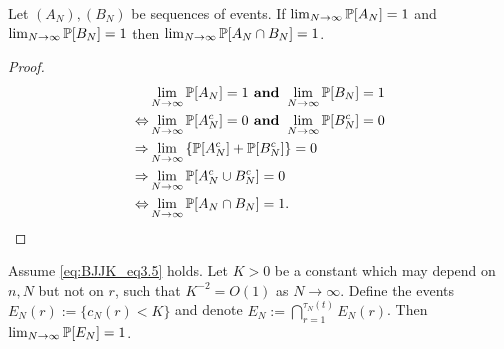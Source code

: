 \begin{lemma}\label{thm:lim_AandB}
Let $(A_N) , (B_N)$ be sequences of events. 
If $\lim_{N\to\infty}\mathbb{P}[A_N] =1$ and $\lim_{N\to\infty}\mathbb{P}[B_N]=1$ then $\lim_{N\to\infty} \mathbb{P} [A_N \cap B_N] =1$.
\end{lemma}
\begin{proof}
\begin{align*}
&\lim_{N\to\infty} \mathbb{P}[A_N] =1 \textbf{ and } 
        \lim_{N\to\infty} \mathbb{P}[B_N] =1 \notag\\
\Leftrightarrow &\lim_{N\to\infty} \mathbb{P}[A_N^c] =0 \textbf{ and } 
        \lim_{N\to\infty} \mathbb{P}[B_N^c] =0 \notag\\
\Rightarrow &\lim_{N\to\infty} \left\{ \mathbb{P}[A_N^c] 
        + \mathbb{P}[B_N^c] \right\} =0 \notag\\
\Rightarrow &\lim_{N\to\infty} \mathbb{P}[A_N^c \cup B_N^c] =0 \notag\\
\Leftrightarrow &\lim_{N\to\infty} \mathbb{P}[ A_N \cap B_N ] =1. \qedhere
\end{align*}
\end{proof}

\begin{lemma}\label{thm:indicators_cN}
Assume \eqref{eq:BJJK_eq3.5} holds.
Let $K>0$ be a constant which may depend on $n, N$ but not on $r$, such that $K^{-2} = O(1)$ as $N\to\infty$.
Define the events $E_N(r) := \{ c_N(r) < K \}$ and denote $E_N := \bigcap_{r=1}^{\tau_N(t)} E_N(r)$.
Then $\lim_{N\to\infty} \mathbb{P}[E_N]=1$.
\end{lemma}

